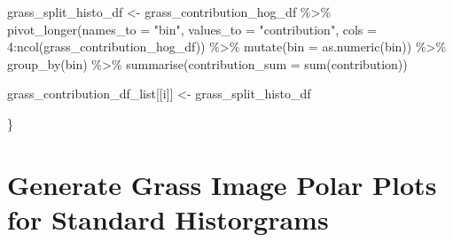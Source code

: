 \documentclass[
  letterpaper,
  DIV=11,
  numbers=noendperiod]{scrreprt}
\newenvironment{Shaded}{\begin{snugshade}}{\end{snugshade}}
\newcommand{\AttributeTok}[1]{\textcolor[rgb]{0.40,0.45,0.13}{#1}}
\newcommand{\DecValTok}[1]{\textcolor[rgb]{0.68,0.00,0.00}{#1}}
\newcommand{\FunctionTok}[1]{\textcolor[rgb]{0.28,0.35,0.67}{#1}}
\newcommand{\NormalTok}[1]{\textcolor[rgb]{0.00,0.23,0.31}{#1}}
\newcommand{\OtherTok}[1]{\textcolor[rgb]{0.00,0.23,0.31}{#1}}
\newcommand{\SpecialCharTok}[1]{\textcolor[rgb]{0.37,0.37,0.37}{#1}}
\newcommand{\StringTok}[1]{\textcolor[rgb]{0.13,0.47,0.30}{#1}}
\begin{document}
\begin{Shaded}
\begin{Highlighting}[]
\NormalTok{  grass\_split\_histo\_df }\OtherTok{\textless{}{-}} 
\NormalTok{    grass\_contribution\_hog\_df }\SpecialCharTok{\%\textgreater{}\%}
    \FunctionTok{pivot\_longer}\NormalTok{(}\AttributeTok{names\_to =} \StringTok{"bin"}\NormalTok{, }
                 \AttributeTok{values\_to =} \StringTok{"contribution"}\NormalTok{, }
                 \AttributeTok{cols =} \DecValTok{4}\SpecialCharTok{:}\FunctionTok{ncol}\NormalTok{(grass\_contribution\_hog\_df)) }\SpecialCharTok{\%\textgreater{}\%}
    \FunctionTok{mutate}\NormalTok{(}\AttributeTok{bin =} \FunctionTok{as.numeric}\NormalTok{(bin)) }\SpecialCharTok{\%\textgreater{}\%}
    \FunctionTok{group\_by}\NormalTok{(bin) }\SpecialCharTok{\%\textgreater{}\%}
    \FunctionTok{summarise}\NormalTok{(}\AttributeTok{contribution\_sum =} \FunctionTok{sum}\NormalTok{(contribution))}
  
  
\NormalTok{  grass\_contribution\_df\_list[[i]] }\OtherTok{\textless{}{-}}\NormalTok{ grass\_split\_histo\_df}

\NormalTok{\}}
\end{Highlighting}
\end{Shaded}

\section{Generate Grass Image Polar Plots for Standard
Historgrams}\label{generate-grass-image-polar-plots-for-standard-historgrams}
\end{document}
